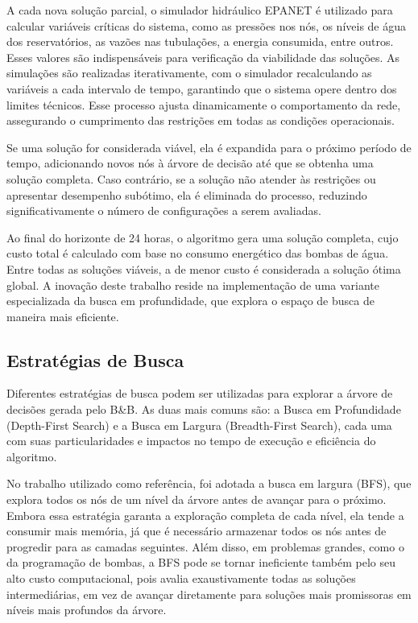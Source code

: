 \documentclass[12pt,a4paper,oneside,linenumbers=off,latinmodern=off,timesnews=off,english,spanish]{rctart-class/rctart}
\begin{document}
A cada nova solução parcial, o simulador hidráulico EPANET é utilizado para calcular variáveis críticas do sistema, como as pressões nos nós, os níveis de água dos reservatórios, as vazões nas tubulações, a energia consumida, entre outros. Esses valores são indispensáveis para verificação da viabilidade das soluções. As simulações são realizadas iterativamente, com o simulador recalculando as variáveis a cada intervalo de tempo, garantindo que o sistema opere dentro dos limites técnicos. Esse processo ajusta dinamicamente o comportamento da rede, assegurando o cumprimento das restrições em todas as condições operacionais.

Se uma solução for considerada viável, ela é expandida para o próximo período de tempo, adicionando novos nós à árvore de decisão até que se obtenha uma solução completa. Caso contrário, se a solução não atender às restrições ou apresentar desempenho subótimo, ela é eliminada do processo, reduzindo significativamente o número de configurações a serem avaliadas.

Ao final do horizonte de 24 horas, o algoritmo gera uma solução completa, cujo custo total é calculado com base no consumo energético das bombas de água. Entre todas as soluções viáveis, a de menor custo é considerada a solução ótima global. A inovação deste trabalho reside na implementação de uma variante especializada da busca em profundidade, que explora o espaço de busca de maneira mais eficiente.


\subsection{Estratégias de Busca}

Diferentes estratégias de busca podem ser utilizadas para explorar a árvore de decisões gerada pelo B\&B. As duas mais comuns são: a Busca em Profundidade (Depth-First Search) e a Busca em Largura (Breadth-First Search), cada uma com suas particularidades e impactos no tempo de execução e eficiência do algoritmo.

No trabalho utilizado como referência, foi adotada a busca em largura (BFS), que explora todos os nós de um nível da árvore antes de avançar para o próximo. Embora essa estratégia garanta a exploração completa de cada nível, ela tende a consumir mais memória, já que é necessário armazenar todos os nós antes de progredir para as camadas seguintes. Além disso, em problemas grandes, como o da programação de bombas, a BFS pode se tornar ineficiente também pelo seu alto custo computacional, pois avalia exaustivamente todas as soluções intermediárias, em vez de avançar diretamente para soluções mais promissoras em níveis mais profundos da árvore.
\end{document}
